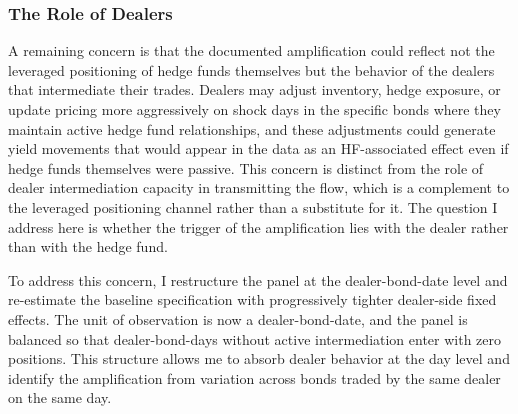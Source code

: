 \documentclass[english, 11pt, oneside]{article}
\begin{document}
\subsubsection{The Role of Dealers}

A remaining concern is that the documented amplification could reflect not the leveraged positioning of hedge funds themselves but the behavior of the dealers that intermediate their trades. Dealers may adjust inventory, hedge exposure, or update pricing more aggressively on shock days in the specific bonds where they maintain active hedge fund relationships, and these adjustments could generate yield movements that would appear in the data as an HF-associated effect even if hedge funds themselves were passive. This concern is distinct from the role of dealer intermediation capacity in transmitting the flow, which is a complement to the leveraged positioning channel rather than a substitute for it. The question I address here is whether the trigger of the amplification lies with the dealer rather than with the hedge fund.

To address this concern, I restructure the panel at the dealer-bond-date level and re-estimate the baseline specification with progressively tighter dealer-side fixed effects. The unit of observation is now a dealer-bond-date, and the panel is balanced so that dealer-bond-days without active intermediation enter with zero positions. This structure allows me to absorb dealer behavior at the day level and identify the amplification from variation across bonds traded by the same dealer on the same day.
\end{document}
